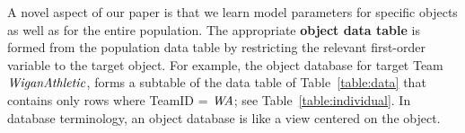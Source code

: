 {{\begin{table}[htbp]
				\caption{Sample Object Data Table, for team $\team = \it{WA}$. \label{table:individual}}
		\end{table}
		
		
		
		
		A novel aspect of our paper is that we learn model parameters for specific objects as well as for the entire population. 
		The appropriate \textbf{object data table} is formed from the population data table by restricting the relevant first-order variable to the target object. 
		For example, the object database for target Team $\it{Wigan Athletic}$, 
		forms a subtable of the data table of Table~\ref{table:data} that contains only rows where 
		TeamID = $\it{WA}$; see Table~\ref{table:individual}. In database terminology, an object database is like a view centered on the object.
		
		\begin{table} 


\end{table}}}
